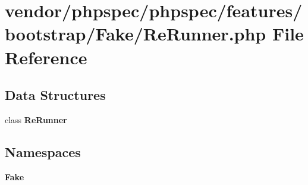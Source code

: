 \section{vendor/phpspec/phpspec/features/bootstrap/\+Fake/\+Re\+Runner.php File Reference}
\label{features_2bootstrap_2_fake_2_re_runner_8php}
\subsection*{Data Structures}
\begin{DoxyCompactItemize}
\item 
class {\bf Re\+Runner}
\end{DoxyCompactItemize}
\subsection*{Namespaces}
\begin{DoxyCompactItemize}
\item 
 {\bf Fake}
\end{DoxyCompactItemize}
